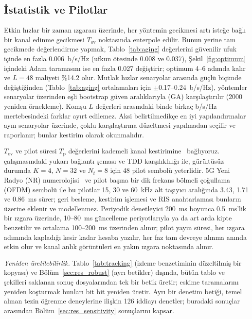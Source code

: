 \subsection{İstatistik ve Pilotlar}
Etkin hızlar bir zaman ızgarası üzerinde, her yöntemin gecikmesi artı isteğe bağlı bir kanal edinme gecikmesi $T_{\mathrm{ov}}$ noktasında enterpole edilir. Bunun yerine tam gecikmede değerlendirme yapmak, Tablo~\ref{tab:aging} değerlerini güvenilir ufuk içinde en fazla 0.006~b/s/Hz (ufkun ötesinde 0.008 ve 0.037), Şekil~\ref{fig:optimum} içindeki Adam taramasını ise en fazla 0.027 değiştirir; optimum 4--6 adımda kalır ve $L=48$ maliyeti \%14.2 olur. Mutlak hızlar senaryolar arasında güçlü biçimde değiştiğinden (Tablo~\ref{tab:aging} ortalamaları için $\pm$0.17--0.24~b/s/Hz), yöntemler senaryolar üzerinden eşli bootstrap güven aralıklarıyla (GA) karşılaştırılır (2000 yeniden örnekleme). Komşu $L$ değerleri arasındaki binde birkaç b/s/Hz mertebesindeki farklar ayırt edilemez. Aksi belirtilmedikçe en iyi yapılandırmalar aynı senaryolar üzerinde, çoklu karşılaştırma düzeltmesi yapılmadan seçilir ve raporlanır; bunlar kestirim olarak okunmalıdır.

$T_{\mathrm{ov}}$ ve pilot süresi $T_{\mathrm{p}}$ değerlerini kademeli kanal kestirimine~\cite{Zheng2022COMST} bağlıyoruz. \cite{Wang2020TWC} çalışmasındaki yukarı bağlantı şeması ve TDD karşılıklılığı ile, gürültüsüz durumda $K=4$, $N=32$ ve $N_t=8$ için 48 pilot sembolü yeterlidir. 5G Yeni Radyo (NR) numerolojisi~\cite{3gpp_nr_phy} ve pilot başına bir dik frekans bölmeli çoğullama (OFDM) sembolü ile bu pilotlar 15, 30 ve 60~kHz alt taşıyıcı aralığında 3.43, 1.71 ve 0.86~ms sürer; geri besleme, kestirim işlemesi ve RIS anahtarlaması bunların üzerine eklenir ve modellenmez. Periyodik denetleyici 200~ms boyunca 0.5~ms'lik bir ızgara üzerinde, 10--80~ms güncelleme periyotlarıyla ya da art arda kipte benzetilir ve ortalama 100--200~ms üzerinden alınır; pilot yayın süresi, her ızgara adımında kapladığı kesir kadar hesaba yazılır, her faz tam devreye alınma anında etkin olur ve kanal anlık görüntüleri en yakın ızgara noktasında alınır.

\emph{Yeniden üretilebilirlik.} Tablo~\ref{tab:tracking} (izleme benzetiminin düzeltilmiş bir kopyası) ve Bölüm~\ref{sec:res_robust} (ayrı betikler) dışında, bütün tablo ve şekilleri saklanan sonuç dosyalarından tek bir betik üretir; eskime taramalarını yeniden koşturmak bunları bit bit yeniden üretir. Ayrı bir denetim betiği, temel alınan tezin öğrenme deneylerine ilişkin 126 iddiayı denetler; buradaki sonuçlar arasından Bölüm~\ref{sec:res_sensitivity} sonuçlarını kapsar.

